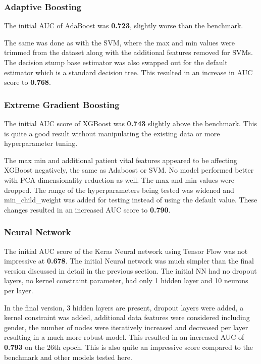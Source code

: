 \documentclass[11pt]{article}
\begin{document}
	\subsubsection{Adaptive Boosting}
	The initial AUC of AdaBoost was \textbf{0.723}, slightly worse than the benchmark.
	
	The same was done as with the SVM, where the max and min values were trimmed from the dataset along with the additional features removed for SVMs. The decision stump base estimator was also swapped out for the default estimator which is a standard decision tree. This resulted in an increase in AUC score to \textbf{0.768}. 
	
	\subsubsection{Extreme Gradient Boosting}
	The initial AUC score of XGBoost was \textbf{0.743} slightly above the benchmark. This is quite a good result without manipulating the existing data or more hyperparameter tuning.
	
	The max min and additional patient vital features appeared to be affecting XGBoost negatively, the same as Adaboost or SVM. No model performed better with PCA dimensionality reduction as well. The max and min values were dropped. The range of the hyperparameters being tested was widened and min\_child\_weight was added for testing instead of using the default value. These changes resulted in an increased AUC score to \textbf{0.790}. 
	
	\subsubsection{Neural Network}
    The initial AUC score of the Keras Neural network using Tensor Flow was not impressive at \textbf{0.678}. The initial Neural network was much simpler than the final version discussed in detail in the previous section. The initial NN had no dropout layers, no kernel constraint parameter, had only 1 hidden layer and 10 neurons per layer.

	In the final version, 3 hidden layers are present, dropout layers were added, a kernel constraint was added, additional data features were considered including gender, the number of nodes were iteratively increased and decreased per layer resulting in a much more robust model. This resulted in an increased AUC of \textbf{0.793} on the 26th epoch. This is also quite an impressive score compared to the benchmark and other models tested here.
\end{document}
